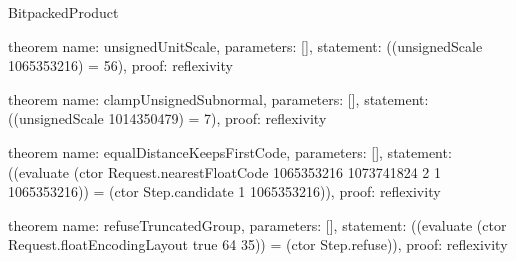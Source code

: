 \begin{lexlean}{BitpackedProduct}
\begin{semanticmodule}
theorem{
  name: unsignedUnitScale,
  parameters: [],
  statement: ((unsignedScale 1065353216) = 56),
  proof: reflexivity{}
}

theorem{
  name: clampUnsignedSubnormal,
  parameters: [],
  statement: ((unsignedScale 1014350479) = 7),
  proof: reflexivity{}
}

theorem{
  name: equalDistanceKeepsFirstCode,
  parameters: [],
  statement: ((evaluate (ctor Request.nearestFloatCode 1065353216 1073741824 2 1 1065353216)) = (ctor Step.candidate 1 1065353216)),
  proof: reflexivity{}
}

theorem{
  name: refuseTruncatedGroup,
  parameters: [],
  statement: ((evaluate (ctor Request.floatEncodingLayout true 64 35)) = (ctor Step.refuse)),
  proof: reflexivity{}
}
\end{semanticmodule}
\end{lexlean}
